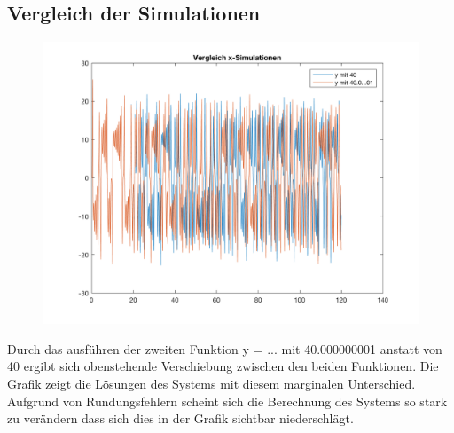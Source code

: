 \documentclass[]{scrartcl}
\begin{document}
\subsection{Vergleich der Simulationen}
\begin{figure}[H]
	\centering
	\includegraphics[width=1\linewidth]{a1_3_2}
	\caption{}
	\label{fig:a1_3_2}
\end{figure}

Durch das ausführen der zweiten Funktion y = ... mit 40.000000001 anstatt von 40 ergibt sich obenstehende Verschiebung zwischen den beiden Funktionen. Die Grafik zeigt die Lösungen des Systems mit diesem marginalen Unterschied. Aufgrund von Rundungsfehlern scheint sich die Berechnung des Systems so stark zu verändern dass sich dies in der Grafik sichtbar niederschlägt.
\end{document}
